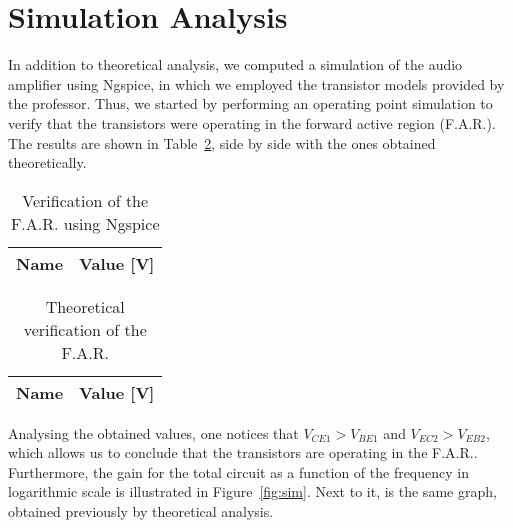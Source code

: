 \section{Simulation Analysis}
\label{sec:simulation}

In addition to theoretical analysis, we computed a simulation of the audio amplifier using Ngspice, in which we employed the transistor models provided by the professor. Thus, we started by performing an operating point simulation to verify that the transistors were operating in the forward active region (F.A.R.). The results are shown in Table~\ref{tab:opngspice}, side by side with the ones obtained theoretically.

\noindent
\begin{minipage}[c]{0.5\linewidth}

\begin{table}[H]
 \centering
 \begin{tabular}{|l|r|}
 \hline
 {\bf Name} & {\bf Value [V]} \\ \hline

 \end{tabular}
 \caption{Verification of the F.A.R. using Ngspice}
 \label{tab:opngspice}
 \end{table}
 
\end{minipage}
\begin{minipage}[c]{0.5\linewidth}

\vspace{-0.5mm}
 
 \begin{table}[H]
 \centering
 \begin{tabular}{|l|r|}
 \hline
 {\bf Name} & {\bf Value [V]} \\ \hline

 \end{tabular}
 \caption{Theoretical verification of the F.A.R.}
 \label{tab:opngspice}
 \end{table}
 
\end{minipage}

\vspace{3mm}

Analysing the obtained values, one notices that $V_{CE1}>V_{BE1}$ and $V_{EC2}>V_{EB2}$, which allows us to conclude that the transistors are operating in the F.A.R.. \\

Furthermore, the gain for the total circuit as a function of the frequency in logarithmic scale is illustrated in Figure~\ref{fig:sim}. Next to it, is the same graph, obtained previously by theoretical analysis.

